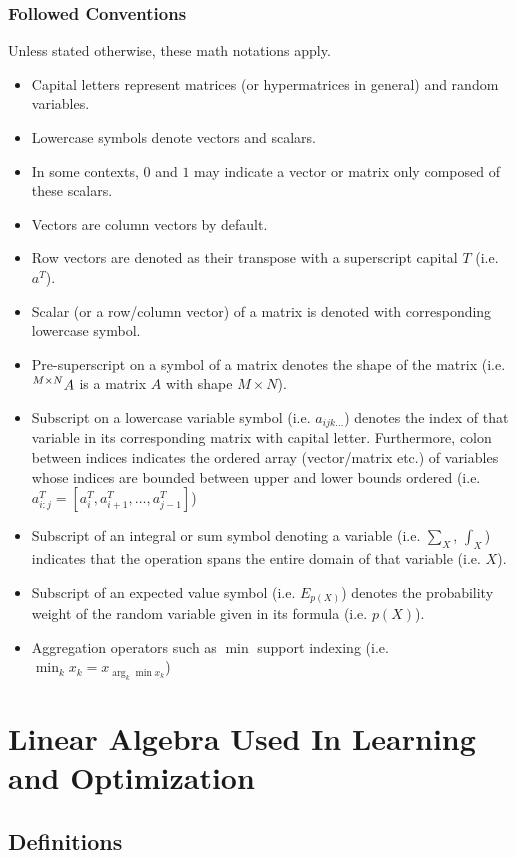 \documentclass{article}
\numberwithin{equation}{subsection}
\begin{document}
\subsubsection{Followed Conventions}
Unless stated otherwise, these math notations apply. 
\begin{itemize}
    \item Capital letters represent matrices (or hypermatrices in general) and random variables.
    \item Lowercase symbols denote vectors and scalars.
    \item In some contexts, $0$ and $1$ may indicate a vector or matrix only composed of these scalars.
    \item Vectors are column vectors by default.
    \item Row vectors are denoted as their transpose with a superscript capital $T$ (i.e. $a^T$).
    \item Scalar (or a row/column vector) of a matrix is denoted with corresponding lowercase symbol.
    \item Pre-superscript on a symbol of a matrix denotes the shape of the matrix (i.e. $\prescript{M\times N}{}{A}$ is a matrix $A$ with shape $M\times N$).
    \item Subscript on a lowercase variable symbol (i.e. $a_{ijk...}$) denotes the index of that variable in its corresponding matrix with capital letter. Furthermore, colon between indices indicates the ordered array (vector/matrix etc.) of variables whose indices are bounded between upper and lower bounds ordered (i.e. $a^T_{i:j} = [a^T_i, a^T_{i+1}, ..., a^T_{j-1}]$)
    \item Subscript of an integral or sum symbol denoting a variable (i.e. $\sum_X$, $\int_X$) indicates that the operation spans the entire domain of that variable (i.e. $X$).
    \item Subscript of an expected value symbol (i.e. $E_{p(X)}$) denotes the probability weight of the random variable given in its formula (i.e. $p(X)$).
    \item Aggregation operators such as $\min$ support indexing (i.e. $\min_kx_k = x_{\arg_k\min x_k}$)
\end{itemize}
\section{Linear Algebra Used In Learning and Optimization}
\subsection{Definitions}
\end{document}
